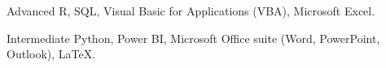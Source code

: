 
\begin{cvskills}

  \cvskill
    {Advanced} %
    {R, SQL, Visual Basic for Applications (VBA), Microsoft Excel.} %

  \cvskill
    {Intermediate} %
    {Python, Power BI, Microsoft Office suite (Word, PowerPoint, Outlook), \LaTeX.} %

\end{cvskills}